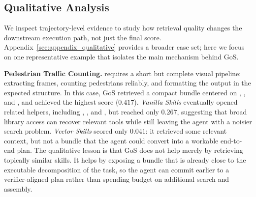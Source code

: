 
\subsection{Qualitative Analysis}

We inspect trajectory-level evidence to study how retrieval quality changes the downstream execution path, not just the final score. Appendix~\ref{sec:appendix_qualitative} provides a broader case set; here we focus on one representative example that isolates the main mechanism behind GoS.

\noindent\textbf{Pedestrian Traffic Counting.}  requires a short but complete visual pipeline: extracting frames, counting pedestrians reliably, and formatting the output in the expected structure. In this case, GoS retrieved a compact bundle centered on , , and , and achieved the highest score ($0.417$). \textit{Vanilla Skills} eventually opened related helpers, including , , and , but reached only $0.267$, suggesting that broad library access can recover relevant tools while still leaving the agent with a noisier search problem. \textit{Vector Skills} scored only $0.041$: it retrieved some relevant context, but not a bundle that the agent could convert into a workable end-to-end plan. The qualitative lesson is that GoS does not help merely by retrieving topically similar skills. It helps by exposing a bundle that is already close to the executable decomposition of the task, so the agent can commit earlier to a verifier-aligned plan rather than spending budget on additional search and assembly.

